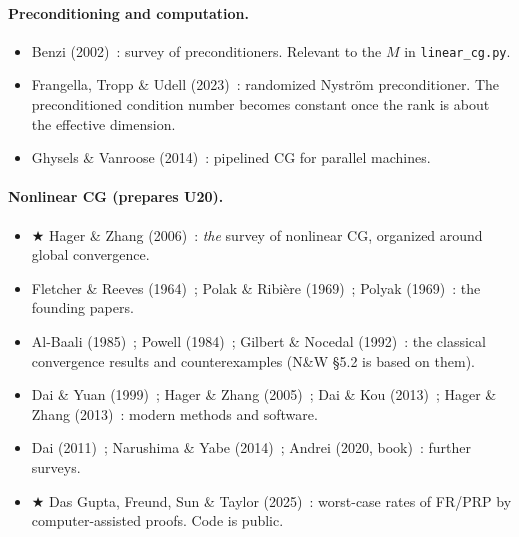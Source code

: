 \documentclass[11pt,a4paper]{article}
\theoremstyle{remark}
\begin{document}
\paragraph{Preconditioning and computation.}
\begin{itemize}[leftmargin=1.5em,itemsep=2pt]
\item Benzi (2002)~\cite{Benzi2002}: survey of preconditioners. Relevant to the $M$ in \texttt{linear\_cg.py}.
\item Frangella, Tropp \& Udell (2023)~\cite{FrangellaTroppUdell2023}: randomized Nystr\"om preconditioner. The preconditioned condition number becomes constant once the rank is about the effective dimension.
\item Ghysels \& Vanroose (2014)~\cite{GhyselsVanroose2014}: pipelined CG for parallel machines.
\end{itemize}

\paragraph{Nonlinear CG (prepares U20).}
\begin{itemize}[leftmargin=1.5em,itemsep=2pt]
\item $\bigstar$ Hager \& Zhang (2006)~\cite{HagerZhang2006}: \emph{the} survey of nonlinear CG, organized around global convergence.
\item Fletcher \& Reeves (1964)~\cite{FletcherReeves1964}; Polak \& Ribi\`ere (1969)~\cite{PolakRibiere1969}; Polyak (1969)~\cite{Polyak1969}: the founding papers.
\item Al-Baali (1985)~\cite{AlBaali1985}; Powell (1984)~\cite{Powell1984}; Gilbert \& Nocedal (1992)~\cite{GilbertNocedal1992}: the classical convergence results and counterexamples (N\&W §5.2 is based on them).
\item Dai \& Yuan (1999)~\cite{DaiYuan1999}; Hager \& Zhang (2005)~\cite{HagerZhang2005}; Dai \& Kou (2013)~\cite{DaiKou2013}; Hager \& Zhang (2013)~\cite{HagerZhang2013}: modern methods and software.
\item Dai (2011)~\cite{Dai2011}; Narushima \& Yabe (2014)~\cite{NarushimaYabe2014}; Andrei (2020, book)~\cite{Andrei2020}: further surveys.
\item $\bigstar$ Das Gupta, Freund, Sun \& Taylor (2025)~\cite{DasGuptaEtAl2025}: worst-case rates of FR/PRP by computer-assisted proofs. Code is public.
\end{itemize}
\end{document}
